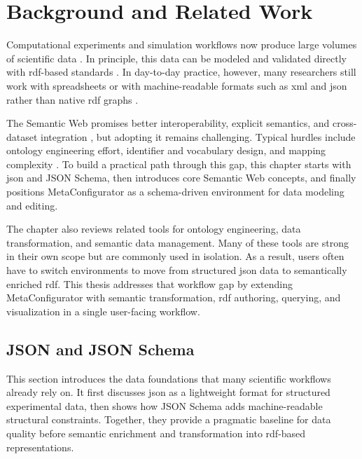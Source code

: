 \chapter{Background and Related Work}
\label{sec:background}

Computational experiments and simulation workflows now produce large volumes of scientific data \cite{boulakia2017workflows,wilkinson2025fairworkflows,villamar2025metadata}. In principle, this data can be modeled and validated directly with \gls{rdf}-based standards \cite{rdf_concepts2014,shacl_standard}. In day-to-day practice, however, many researchers still work with spreadsheets or with machine-readable formats such as \gls{xml} and \gls{json} rather than native \gls{rdf} graphs \cite{metaconfigurator2024,neubauer2026data}.

The Semantic Web promises better interoperability, explicit semantics, and cross-dataset integration \cite{berners2001semantic,janowicz2015geospatial,hogan2021knowledgegraphs}, but adopting it remains challenging. Typical hurdles include ontology engineering effort, identifier and vocabulary design, and mapping complexity \cite{janowicz2015geospatial,hogan2021knowledgegraphs}. To build a practical path through this gap, this chapter starts with \gls{json} and JSON Schema, then introduces core Semantic Web concepts, and finally positions MetaConfigurator as a schema-driven environment for data modeling and editing.

The chapter also reviews related tools for ontology engineering, data transformation, and semantic data management. Many of these tools are strong in their own scope but are commonly used in isolation. As a result, users often have to switch environments to move from structured \gls{json} data to semantically enriched \gls{rdf}. This thesis addresses that workflow gap by extending MetaConfigurator with semantic transformation, \gls{rdf} authoring, querying, and visualization in a single user-facing workflow.

\section{JSON and JSON Schema}

This section introduces the data foundations that many scientific workflows already rely on. It first discusses \gls{json} as a lightweight format for structured experimental data, then shows how JSON Schema adds machine-readable structural constraints. Together, they provide a pragmatic baseline for data quality before semantic enrichment and transformation into \gls{rdf}-based representations.

